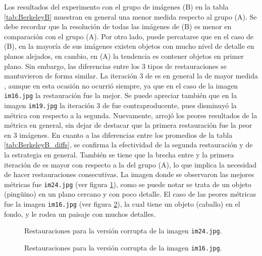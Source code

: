 
Los resultados del experimento con el grupo de im\'agenes (B) en la tabla \ref{tab:BerkeleyB} muestran en general una menor medida \PSNR respecto al grupo (A). Se debe recordar que la resoluci\'on de todas las im\'agenes de (B) es menor en comparaci\'on con el grupo (A). Por otro lado, puede percatarse que en el caso de (B), en la mayor\'ia de sus im\'agenes existen objetos con mucho nivel de detalle en planos alejados, en cambio, en (A) la tendencia es contener objetos en primer plano. Sin embargo, las diferencias entre los 3 tipos de restauraciones se mantuvieron de forma similar. La iteraci\'on 3 de \SOP es en general la de mayor medida \PSNR, aunque en esta ocasión no ocurrió siempre, ya que en el caso de la imagen \texttt{im16.jpg} la restauraci\'on \NS fue la mejor. Se puede apreciar tambi\'en que en la imagen \texttt{im19.jpg} la iteraci\'on 3 de \SOP fue contraproducente, pues disminuy\'o la métrica con respecto a la segunda. Nuevamente, \TELEA arroj\'o los peores resultados de la m\'etrica en general, sin dejar de destacar que la primera restauración \SOP fue la peor en 3 im\'agenes. En cuanto a las diferencias entre los promedios de la tabla \ref{tab:BerkeleyB_diffs}, se confirma la efectividad de la segunda restauraci\'on \SOP y de la estrategia en general. Tambi\'en se tiene que la brecha entre \NS y la primera iteraci\'on de \SOP es mayor con respecto a la del grupo (A), lo que implica la necesidad de hacer restauraciones \SOP consecutivas. La imagen donde se observaron las mejores m\'etricas fue \texttt{im24.jpg} (ver figura \ref{fig:im24.jpg}), como se puede notar se trata de un objeto (ping\"uino) en un plano cercano y con poco detalle. El caso de las peores m\'etricas fue la imagen \texttt{im16.jpg} (ver figura \ref{fig:im16.jpg}), la cual tiene un objeto (caballo) en el fondo, y le rodea un paisaje con muchos detalles.


\begin{figure}[h]
	\centering
	\caption{Restauraciones para la versi\'on corrupta de la imagen \texttt{im24.jpg}.}
	\label{fig:im24.jpg}
\end{figure}

\begin{figure}[h]
	\centering
	\caption{Restauraciones para la versi\'on corrupta de la imagen \texttt{im16.jpg}.}
	\label{fig:im16.jpg}
\end{figure}

